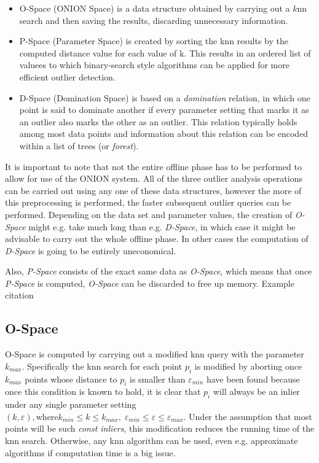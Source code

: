 \documentclass[runningheads]{llncs}
\begin{document}
\begin{itemize}
 \item O-Space (ONION Space) is a data structure obtained by carrying out a $k$nn search and then saving the results, discarding unnecessary information.
 \item P-Space (Parameter Space) is created by sorting the knn results by the computed distance value for each value of k. This results in an ordered list of valuees to which binary-search style algorithms can be applied for more efficient outlier detection.
 \item D-Space (Domination Space) is based on a \emph{domination} relation, in which one point is said to dominate another if every parameter setting that marks it as an outlier also marks the other as an outlier. This relation typically holds among most data points and information about this relation can be encoded within a list of trees (or \emph{forest}).
\end{itemize}

It is important to note that not the entire offline phase has to be performed to allow for use of the ONION system. All of the three outlier analysis operations can be carried out using any one of these data structures, however the more of this preprocessing is performed, the faster subsequent outlier queries can be performed. Depending on the data set and parameter values, the creation of \emph{O-Space} might e.g. take much long than e.g. \emph{D-Space}, in which case it might be advisable to carry out the whole offline phase. In other cases the computation of \emph{D-Space} is going to be entirely uneconomical.

Also, \emph{P-Space} consists of the exact same data as \emph{O-Space}, which means that once \emph{P-Space} is computed, \emph{O-Space} can be discarded to free up memory.
Example citation \cite{DBLP:conf/civr/BeecksUS10}
    \subsection{O-Space}
    O-Space is computed by carrying out a modified knn query with the parameter $k_{max}$. Specifically  the knn search for each point $p_i$ is modified by aborting once $k_{max}$ points whose distance to $p_i$ is smaller than $\varepsilon_{min}$ have been found because once this condition is known to hold, it is clear that $p_i$ will always be an inlier under any single parameter setting $(k,\varepsilon), \text{where} k_{min}\leq k \leq k_{max},\; \varepsilon_{min}\leq \varepsilon \leq \varepsilon_{max}$. Under the assumption that most points will be such \emph{const inliers}, this modification reduces the running time of the knn search. Otherwise, any knn algorithm can be used, even e.g. approximate algorithms if computation time is a big issue.
\end{document}
